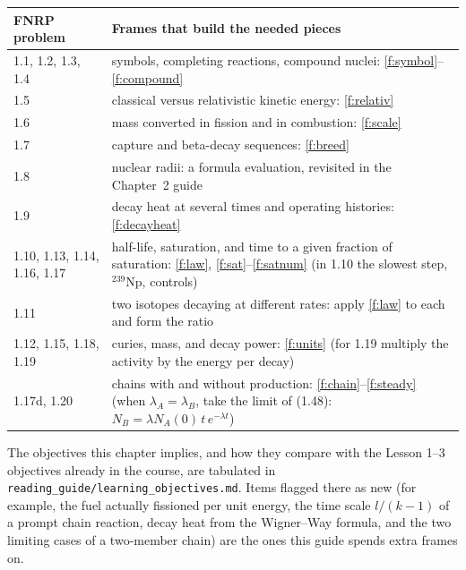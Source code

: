 \documentclass[compact]{ne630handout}
\newcommand{\iso}[2]{\ensuremath{{}^{#1}\mathrm{#2}}}
\begin{document}
\begin{handoutsmall}[8.3]
\begin{tabularx}{\linewidth}{@{}p{0.95in}Y@{}}
\toprule
FNRP problem & Frames that build the needed pieces\\
, 1.2, 1.3, 1.4 & symbols, completing reactions, compound nuclei: \ref*{f:symbol}--\ref*{f:compound}\\
1.5 & classical versus relativistic kinetic energy: \ref*{f:relativ}\\
1.6 & mass converted in fission and in combustion: \ref*{f:scale}\\
1.7 & capture and beta-decay sequences: \ref*{f:breed}\\
1.8 & nuclear radii: a formula evaluation, revisited in the Chapter~2 guide\\
1.9 & decay heat at several times and operating histories: \ref*{f:decayheat}\\
1.10, 1.13, 1.14, 1.16, 1.17 & half-life, saturation, and time to a given fraction of saturation: \ref*{f:law}, \ref*{f:sat}--\ref*{f:satnum} (in 1.10 the slowest step, \iso{239}{Np}, controls)\\
1.11 & two isotopes decaying at different rates: apply \ref*{f:law} to each and form the ratio\\
1.12, 1.15, 1.18, 1.19 & curies, mass, and decay power: \ref*{f:units} (for 1.19 multiply the activity by the energy per decay)\\
1.17d, 1.20 & chains with and without production: \ref*{f:chain}--\ref*{f:steady} (when $\lambda_A=\lambda_B$, take the limit of (1.48): $N_B=\lambda N_A(0)\,t\,e^{-\lambda t}$)\\
\bottomrule
\end{tabularx}
\end{handoutsmall}

\begin{takeawaybox}
The objectives this chapter implies, and how they compare with the Lesson 1--3 objectives already in the course, are tabulated in \texttt{reading\_guide/learning\_objectives.md}. Items flagged there as new (for example, the fuel actually fissioned per unit energy, the time scale $l/(k-1)$ of a prompt chain reaction, decay heat from the Wigner--Way formula, and the two limiting cases of a two-member chain) are the ones this guide spends extra frames on.
\end{takeawaybox}
\end{document}
